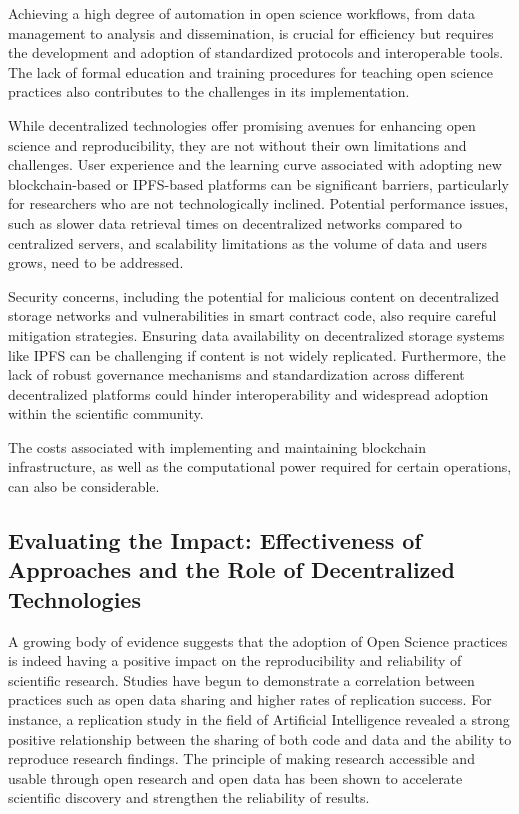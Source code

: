 Achieving a high degree of automation in open science workflows, from data management to analysis and dissemination, is crucial for efficiency but requires the development and adoption of standardized protocols and interoperable tools. The lack of formal education and training procedures for teaching open science practices also contributes to the challenges in its implementation.

While decentralized technologies offer promising avenues for enhancing open science and reproducibility, they are not without their own limitations and challenges. User experience and the learning curve associated with adopting new blockchain-based or IPFS-based platforms can be significant barriers, particularly for researchers who are not technologically inclined. Potential performance issues, such as slower data retrieval times on decentralized networks compared to centralized servers, and scalability limitations as the volume of data and users grows, need to be addressed.

Security concerns, including the potential for malicious content on decentralized storage networks and vulnerabilities in smart contract code, also require careful mitigation strategies. Ensuring data availability on decentralized storage systems like IPFS can be challenging if content is not widely replicated. Furthermore, the lack of robust governance mechanisms and standardization across different decentralized platforms could hinder interoperability and widespread adoption within the scientific community.

The costs associated with implementing and maintaining blockchain infrastructure, as well as the computational power required for certain operations, can also be considerable.

\subsection{Evaluating the Impact: Effectiveness of Approaches and the Role of Decentralized Technologies}

A growing body of evidence suggests that the adoption of Open Science practices is indeed having a positive impact on the reproducibility and reliability of scientific research. Studies have begun to demonstrate a correlation between practices such as open data sharing and higher rates of replication success. For instance, a replication study in the field of Artificial Intelligence revealed a strong positive relationship between the sharing of both code and data and the ability to reproduce research findings. The principle of making research accessible and usable through open research and open data has been shown to accelerate scientific discovery and strengthen the reliability of results.

